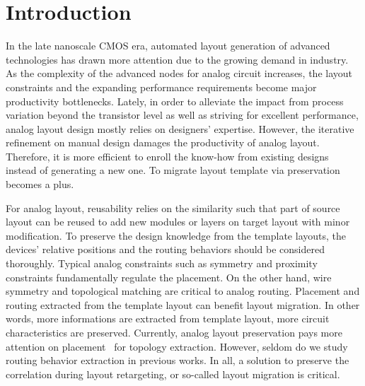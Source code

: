 \chapter{Introduction}\label{sec:Intro}

  In the late nanoscale CMOS era, automated layout generation of advanced technologies has drawn more attention due to the growing demand in industry. As the complexity of the advanced nodes for analog circuit increases, the layout constraints and the expanding performance requirements become major productivity bottlenecks. Lately, in order to alleviate the impact from process variation beyond the transistor level as well as striving for excellent performance, analog layout design mostly relies on designers' expertise. However, the iterative refinement on manual design damages the productivity of analog layout. Therefore, it is more efficient to enroll the know-how from existing designs instead of generating a new one. To migrate layout template via preservation becomes a plus.

  For analog layout, reusability relies on the similarity such that part of source layout can be reused to add new modules or layers on target layout with minor modification. To preserve the design knowledge from the template layouts, the devices' relative positions and the routing behaviors should be considered thoroughly. Typical analog constraints such as symmetry and proximity constraints fundamentally regulate the placement. On the other hand, wire symmetry and topological matching are critical to analog routing. Placement and routing extracted from the template layout can benefit layout migration. In other words, more informations are extracted from template layout, more circuit characteristics are preserved. Currently, analog layout preservation pays more attention on placement~\cite{cart-hammouda-dac06,cbc-bhattacharya-dac04,Wang_ALRGP_TODAES2011} 
  for topology extraction. However, seldom do we study routing behavior extraction in previous works. In all, a solution to preserve the correlation during layout retargeting, or so-called layout migration is critical.


